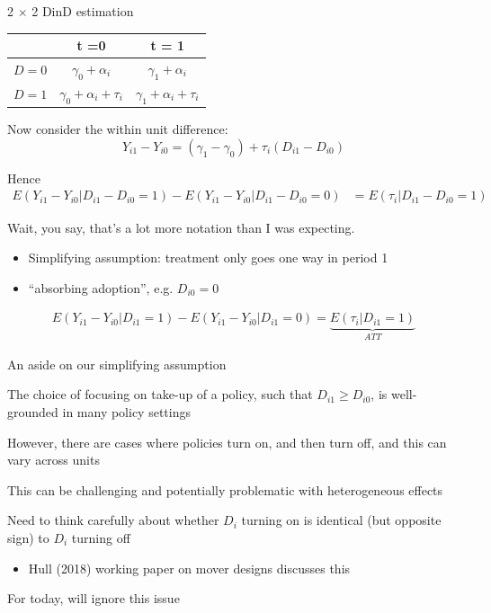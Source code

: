 \documentclass[notes,11pt, aspectratio=169]{beamer}
\newenvironment{wideitemize}{\itemize\addtolength{\itemsep}{10pt}}{\enditemize}
\begin{document}
\begin{frame}{2 $\times$ 2 DinD estimation}
      \begin{center}
        \begin{tabular}{c|cc}
          & t =0 & t = 1\\
          \midrule
          $D = 0$ &  $\gamma_{0} + \alpha_{i}$  & $ \gamma_{1} + \alpha_{i}$\\
          $D = 1$ &  $ \gamma_{0} + \alpha_{i} + \tau_{i} $ & $\gamma_{1} + \alpha_{i} + \tau_{i}$
      \end{tabular}
    \end{center}
    \begin{wideitemize}
    \item Now consider the within unit difference:
      $$Y_{i1} - Y_{i0} = (\gamma_{1} - \gamma_{0}) + \tau_{i}(D_{i1} - D_{i0})$$
    \item Hence 
    \begin{align*}
      E(Y_{i1} - Y_{i0} | D_{i1} - D_{i0} = 1) - E(Y_{i1} - Y_{i0} | D_{i1} - D_{i0} = 0) &= E(\tau_{i}  | D_{i1} - D_{i0} = 1) 
    \end{align*}
  \item Wait, you say, that's a lot more notation than I was expecting.
    \begin{itemize}
    \item Simplifying assumption: treatment only goes one way in
      period 1
    \item  ``absorbing adoption'', e.g. $D_{i0} = 0$
    \end{itemize}
    \begin{align*}
      E(Y_{i1} - Y_{i0} | D_{i1} = 1) - E(Y_{i1} - Y_{i0} | D_{i1} = 0) =  \underbrace{E(\tau_{i}  | D_{i1} = 1) }_{ATT}
    \end{align*}
  \end{wideitemize}
\end{frame}

\begin{frame}{An aside on our simplifying assumption}
  \begin{wideitemize}
  \item The choice of focusing on take-up of a policy, such that $D_{i1} \geq D_{i0}$, is well-grounded in many policy settings
  \item However, there are cases where policies turn on, and then turn off, and this can vary across units
  \item This can be challenging and potentially problematic with
    heterogeneous effects
  \item Need to think carefully about whether $D_{i}$ turning on is
    identical (but opposite sign) to $D_{i}$ turning off
    \begin{itemize}
    \item Hull (2018) working paper on mover designs discusses this
    \end{itemize}
  \item For today, will ignore this issue
  \end{wideitemize}
\end{frame}
\end{document}
